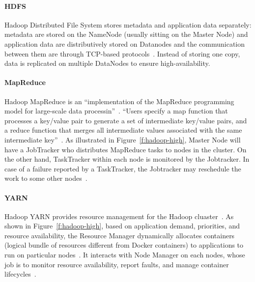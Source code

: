 \paragraph{HDFS} Hadoop Distributed File System stores metadata and 
application data separately: metadata are stored on the NameNode (usually 
sitting on the Master Node) and application data are distributively stored on 
Datanodes and the communication between them are through TCP-based
protocols~\cite{hid-sp18-405-shvachko2010hdfs}. Instead of storing one 
copy, data is replicated on multiple DataNodes to ensure high-availability. 

\paragraph{MapReduce} Hadoop MapReduce is an ``implementation of the 
MapReduce programming model for large-scale data 
processin''~\cite{hid-sp18-405-hadoop-official}. ``Users specify a map 
function that processes a key/value pair to generate a set of intermediate 
key/value pairs, and a reduce function that merges all intermediate
values associated with the same intermediate 
key''~\cite{hid-sp18-405-dean2008mapreduce}. As illustrated in 
Figure~\ref{f:hadoop-high}, Master Node will have a JobTracker who 
distributes MapReduce tasks to nodes in the cluster. On the other hand, 
TaskTracker within each node is monitored by the Jobtracker. In case of a 
failure reported by a TaskTracker, the Jobtracker may reschedule the work to 
some other nodes~\cite{hid-sp18-405-hadoop-jobtracker}. 

\paragraph{YARN} Hadoop YARN provides resource management for the 
Hadoop cluaster~\cite{hid-sp18-405-hadoop-official}. As shown in 
Figure~\ref{f:hadoop-high}, based on application demand, priorities,
and resource availability, the Resource Manager dynamically allocates
containers (logical bundle of resources different from Docker containers) to 
applications to run on particular nodes~\cite{hid-sp18-405-vavi2013yarn}. It 
interacts with Node Manager on each nodes, whose job is to monitor 
resource availability, report faults, and manage container 
lifecycles~\cite{hid-sp18-405-vavi2013yarn}. 

